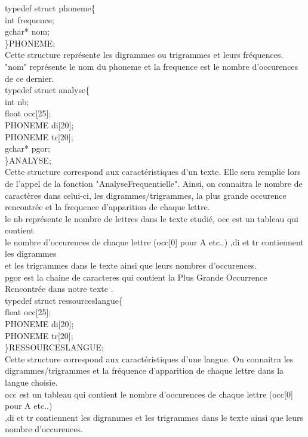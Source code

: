 \documentclass[a4]{article}
\begin{document}
		
		
	typedef struct phoneme\{\\
		int frequence;\\
		gchar* nom;\\
	\}PHONEME;\\
	Cette structure représente les digrammes ou trigrammes et leurs fréquences.\\
	"nom" représente le nom du phoneme et la frequence est le nombre d'occurences\\
	de ce dernier.\\
	
	typedef struct analyse\{ \\
		int nb; \\
		float occ[25];\\
		PHONEME di[20];\\
		PHONEME tr[20];\\
		gchar* pgor;\\
	\}ANALYSE;\\
	Cette structure correspond aux caractéristiques d'un texte. Elle sera remplie lors de
	l'appel de la fonction "AnalyseFrequentielle". Ainsi, on connaitra
	le nombre de caractères dans celui-ci, les digrammes/trigrammes, la plus grande occurence
	rencontrée et la frequence d'apparition de chaque lettre.\\
	le nb représente le nombre de lettres dans le texte etudié, occ est un tableau qui contient \\
	le nombre d'occurences de chaque lettre (occ[0] pour A etc..) ,di et tr contiennent les digrammes \\
	et les trigrammes dans le texte ainsi que leurs nombres d'occurences.\\
	pgor est la chaine de caracteres qui contient la Plus Grande Occurrence Rencontrée dans notre texte .\\
	
	
	typedef struct ressourceslangue\{ \\
		float occ[25];\\
		PHONEME di[20];\\
		PHONEME tr[20];\\
	\}RESSOURCESLANGUE;\\
	Cette structure correspond aux caractéristiques d'une langue. On connaitra
	les digrammes/trigrammes et la fréquence d'apparition de chaque lettre dans la langue choisie.\\
	occ est un tableau qui contient le nombre d'occurences de chaque lettre (occ[0] pour A etc..) \\
	,di et tr contiennent les digrammes et les trigrammes dans le texte ainsi que leurs nombre d'occurences.
\end{document}
